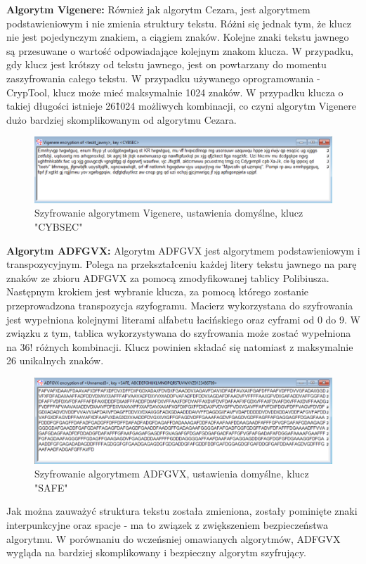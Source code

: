 \documentclass{article}
\begin{document}
\textbf{Algorytm Vigenere:}
Również jak algorytm Cezara, jest algorytmem podstawieniowym i nie zmienia struktury tekstu. Różni się jednak tym, że klucz nie jest pojedynczym znakiem, a ciągiem znaków. 
Kolejne znaki tekstu jawnego są przesuwane o wartość odpowiadające kolejnym znakom klucza. W przypadku, gdy klucz jest krótszy od tekstu jawnego, jest on powtarzany
do momentu zaszyfrowania całego tekstu. W przypadku używanego oprogramowania - CrypTool, klucz może mieć maksymalnie 1024 znaków. W przypadku klucza o takiej długości
istnieje 26\^1024 możliwych kombinacji, co czyni algorytm Vigenere dużo bardziej skomplikowanym od algorytmu Cezara.

\begin{figure}[H]
    \centering
    \includegraphics[width=\textwidth]{vigenere_szyfr.png}
    \caption{Szyfrowanie algorytmem Vigenere, ustawienia domyślne, klucz "CYBSEC"}
\end{figure}

\textbf{Algorytm ADFGVX:}
Algorytm ADFGVX jest algorytmem podstawieniowym i transpozycyjnym. Polega na przekształceniu każdej litery tekstu jawnego na parę znaków ze zbioru ADFGVX za pomocą zmodyfikowanej tablicy 
Polibiusza. Następnym krokiem jest wybranie klucza, za pomocą którego zostanie przeprowadzona transpozycja szyfogramu. Macierz wykorzystana do szyfrowania jest wypełniona kolejnymi literami alfabetu łacińskiego oraz
cyframi od 0 do 9. W związku z tym, tablica wykorzystywana do szyfrowania może zostać wypełniona na 36! różnych kombinacji. Klucz powinien składać się natomiast z maksymalnie 26 unikalnych znaków.
\begin{figure}[H]
    \centering
    \includegraphics[width=\textwidth]{adfgvx_szyfr.png}
    \caption{Szyfrowanie algorytmem ADFGVX, ustawienia domyślne, klucz "SAFE"}
\end{figure}
Jak można zauważyć struktura tekstu została zmieniona, zostały pominięte znaki interpunkcyjne oraz spacje - ma to związek z zwiększeniem bezpieczeństwa algorytmu.
W porównaniu do wczeńsniej omawianych algorytmów, ADFGVX wygląda na bardziej skomplikowany i bezpieczny algorytm szyfrujący.
\end{document}
